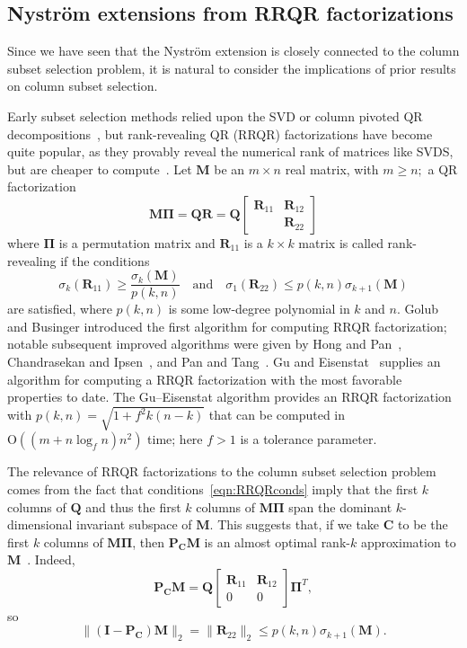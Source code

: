 \documentclass[11pt,letterpaper,twoside,reqno,nosumlimits]{amsart}
\def\transp{T}
\newcommand{\mat}[1]{\ensuremath{\mathbf{#1}}}
\newcommand{\snorm}[1]{\ensuremath{\big\|#1\big\|_2}}
\newcommand{\const}[1]{\ensuremath{\mathrm{#1}}}
\theoremstyle{remark}
\begin{document}
\subsection{Nystr\"om extensions from RRQR factorizations}
Since we have seen that the Nystr\"om extension is closely connected to the column subset selection problem, it is natural to consider the implications of prior results on column subset selection.

Early subset selection methods relied upon the SVD or column pivoted QR decompositions~\cite{GKS76,GL96}, but rank-revealing QR (RRQR) factorizations have become quite popular, as they provably reveal the numerical rank of matrices like SVDS, but are cheaper to compute~\cite{CH92}. Let $\mat{M}$ be an $m \times n$ real matrix, with $m \geq n;$ a QR factorization   
\[
 \mat{M} \mat{\Pi} = \mat{Q} \mat{R} = \mat{Q} 
\left[
\begin{matrix} 
 \mat{R}_{11} & \mat{R}_{12} \\
 & \mat{R}_{22}
\end{matrix}
\right]
\]
where $\mat{\Pi}$ is a permutation matrix and $\mat{R}_{11}$ is a $k \times k$ matrix is called rank-revealing if the conditions
\begin{equation}
\label{eqn:RRQRconds}
 \sigma_k(\mat{R}_{11}) \geq \frac{\sigma_k(\mat{M})}{p(k,n)} \quad \text{and} \quad \sigma_1(\mat{R}_{22}) \leq  p(k,n) \sigma_{k+1}(\mat{M})
\end{equation}
are satisfied, where $p(k,n)$ is some low-degree polynomial in $k$ and $n.$ Golub and Businger introduced the first algorithm for computing RRQR factorization; notable subsequent improved algorithms were given by Hong and Pan~\cite{HP92}, Chandrasekan and Ipsen~\cite{CI94}, and Pan and Tang~\cite{PT99}. Gu and Eisenstat~\cite{EG96} supplies an algorithm for computing a RRQR factorization with the most favorable properties to date. The Gu--Eisenstat algorithm provides an RRQR factorization with $p(k,n) = \sqrt{1 + f^2 k(n-k)}$ that can be computed in $\const{O}((m + n \log_f n)n^2)$ time; here $f > 1$ is a tolerance parameter. 

The relevance of RRQR factorizations to the column subset selection problem comes from the fact that conditions~\eqref{eqn:RRQRconds} imply that the first $k$ columns of $\mat{Q}$ and thus the first $k$ columns of $\mat{M}\mat{\Pi}$ span the dominant $k$-dimensional invariant subspace of $\mat{M}.$ This suggests that, if we take $\mat{C}$ to be the first $k$ columns of $\mat{M} \mat{\Pi}$, then $\mat{P}_{\mat{C}} \mat{M}$ is an almost optimal rank-$k$ approximation to $\mat{M}$~\cite{CH92}. Indeed,
\[
 \mat{P}_{\mat{C}}\mat{M} = \mat{Q} 
\left[
\begin{matrix} 
 \mat{R}_{11} & \mat{R}_{12} \\
 0 & 0
\end{matrix}
\right]
\mat{\Pi}^\transp,
\]
so
\[
 \snorm{(\mat{I} - \mat{P}_{\mat{C}})\mat{M}} = \snorm{\mat{R}_{22}} \leq p(k,n) \sigma_{k+1}(\mat{M}).
\]
\end{document}
